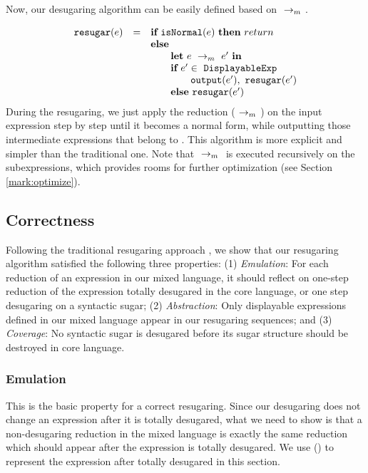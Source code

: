 
Now, our desugaring algorithm can be easily defined based on $~\rightarrow_m~$.

\[
\begin{array}{llll}
\mbox{\tt resugar} (e) &=& \mbox{\rm \bf if}~\mbox{\tt isNormal}(e)~\mbox{\rm \bf then}~return\\
              & & \mbox{\rm \bf else}~\\
							& & \qquad \mbox{\rm \bf let}~e ~\rightarrow_m~e'~\mbox{\rm \bf in}\\
							& & \qquad \mbox{\rm \bf if}~e' \in~\mbox{\tt DisplayableExp} \\
							& & \qquad \qquad \mbox{\tt output}(e'),~\mbox{\tt resugar}(e')\\
							& & \qquad \mbox{\rm \bf else}~\mbox{\tt resugar}(e')
\end{array}
\]
During the resugaring, we just apply the reduction ($~\rightarrow_m~$) on the input expression step by step until it becomes a normal form, while outputting those intermediate expressions that belong to . This algorithm is more explicit and simpler than the traditional one. Note that $~\rightarrow_m~$ is executed recursively on the subexpressions, which provides rooms for further optimization (see Section \ref{mark:optimize}).

\subsection{Correctness}
\label{mark:correct}

Following the traditional resugaring approach \cite{resugaring,hygienic}, we show that our resugaring algorithm satisfied the following three properties:
(1)
\emph{Emulation}: For each reduction of an expression in our mixed language, it should reflect on one-step reduction of the expression totally desugared in the core language, or one step desugaring on a syntactic sugar;
(2)
\emph{Abstraction}: Only displayable expressions defined in our mixed language appear in our resugaring sequences; and
(3)
\emph{Coverage}: No syntactic sugar is desugared before its sugar structure should be destroyed in core language.

\subsubsection{Emulation} This is the basic property for a correct resugaring. Since our desugaring does not change an expression after it is totally desugared, what we need to show is that a non-desugaring reduction in the mixed language is exactly the same  reduction which should appear after the expression is totally desugared. We use () to represent the expression after  totally desugared in this section.

